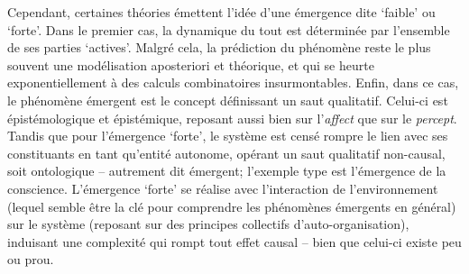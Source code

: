 \documentclass{article}
\begin{document}
Cependant, certaines théories émettent l'idée d'une émergence dite `faible' ou `forte'. Dans le premier cas, la dynamique du tout est déterminée par l'ensemble de ses parties `actives'. Malgré cela, la prédiction du phénomène reste le plus souvent une modélisation aposteriori et théorique, et qui se heurte exponentiellement à des calculs combinatoires insurmontables. Enfin, dans ce cas, le phénomène émergent est le concept définissant un saut qualitatif. Celui-ci est épistémologique et épistémique, reposant aussi bien sur l'\textit{affect} que sur le \textit{percept}. Tandis que pour l'émergence `forte', le système est censé rompre le lien avec ses constituants en tant qu'entité autonome, opérant un saut qualitatif non-causal, soit ontologique -- autrement dit émergent; l'exemple type est l'émergence de la conscience. L'émergence `forte' se réalise avec l'interaction de l'environnement (lequel semble être la clé pour comprendre les phénomènes émergents en général) sur le système (reposant sur des principes collectifs d'auto-organisation), induisant une complexité qui rompt tout effet causal -- bien que celui-ci existe peu ou prou.
%  
%
%
%
\end{document}
